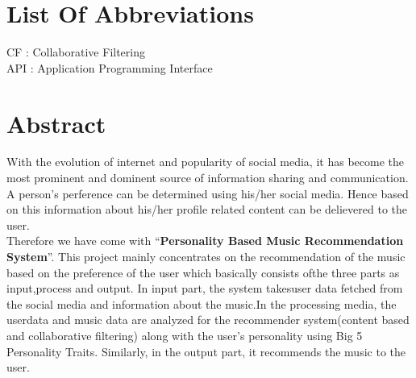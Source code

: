 \documentclass[a4paper,12pt]{article}
\begin{document}
\tableofcontents
\thispagestyle{empty}
\cleardoublepage


\listoffigures
\thispagestyle{empty}
\cleardoublepage

\section*{List Of Abbreviations}
\thispagestyle{empty}
CF : Collaborative Filtering\\
API : Application Programming Interface

\cleardoublepage

\section*{Abstract}
With the evolution of internet and popularity of social media, it has become the most prominent and dominent source of information sharing and communication. A person's perference can be determined using his/her social media. Hence based on this information about his/her profile related content can be delievered to the user.\\
Therefore we have come with ``\textbf{Personality Based Music Recommendation System}''. This project mainly concentrates on the recommendation of the music based on the preference of the user which basically consists ofthe three parts as input,process and output. In input part, the system takesuser data fetched from the social media and information about the music.In the processing media, the userdata and music data are analyzed for the recommender system(content based and collaborative filtering) along with the user's personality using Big 5 Personality Traits. Similarly, in the output part, it recommends the music to the user.
\thispagestyle{empty}
\cleardoublepage
{}
\end{document}
